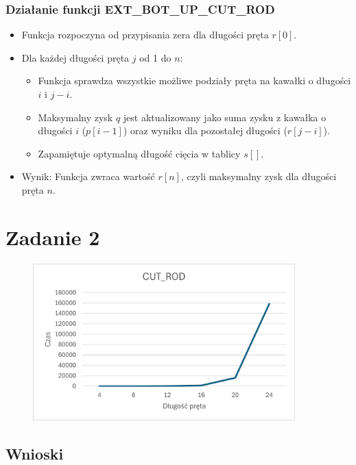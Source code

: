 \documentclass{article}
\begin{document}
			\subsubsection*{Działanie funkcji EXT\_BOT\_UP\_CUT\_ROD} 
			\begin{itemize}
				\item Funkcja rozpoczyna od przypisania zera dla długości pręta $r[0]$.
				\item Dla każdej długości pręta $j$ od 1 do $n$:
				\begin{itemize}
					\item Funkcja sprawdza wszystkie możliwe podziały pręta na kawałki o długości $i$ i $j - i$.
					\item Maksymalny zysk $q$ jest aktualizowany jako suma zysku z kawałka o długości $i$ ($p[i - 1]$) oraz wyniku dla pozostałej długości ($r[j - i]$).
					\item Zapamiętuje optymalną długość cięcia w tablicy $s[]$.
				\end{itemize}
				\item Wynik: Funkcja zwraca wartość $r[n]$, czyli maksymalny zysk dla długości pręta $n$.
			\end{itemize}
		
	\newpage
	\section*{Zadanie 2}
	\begin{figure}[H]
		\centering
		\includegraphics[width=0.9\textwidth]{CutRod.png}
	\end{figure}
	
	\subsection*{Wnioski} 
	
\end{document}
